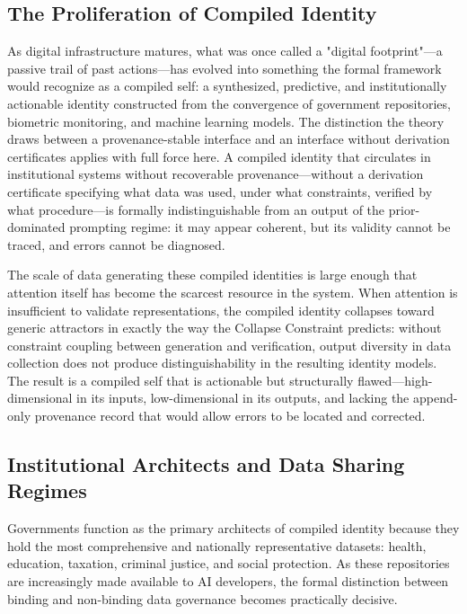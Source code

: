 \documentclass[12pt, a4paper]{article}
\theoremstyle{plain}
\theoremstyle{definition}
\theoremstyle{remark}
\begin{document}
\subsection{The Proliferation of Compiled Identity}

As digital infrastructure matures, what was once called a "digital footprint"---a passive trail of past actions---has evolved into something the formal framework would recognize as a compiled self: a synthesized, predictive, and institutionally actionable identity constructed from the convergence of government repositories, biometric monitoring, and machine learning models. The distinction the theory draws between a provenance-stable interface and an interface without derivation certificates applies with full force here. A compiled identity that circulates in institutional systems without recoverable provenance---without a derivation certificate specifying what data was used, under what constraints, verified by what procedure---is formally indistinguishable from an output of the prior-dominated prompting regime: it may appear coherent, but its validity cannot be traced, and errors cannot be diagnosed.

The scale of data generating these compiled identities is large enough that attention itself has become the scarcest resource in the system. When attention is insufficient to validate representations, the compiled identity collapses toward generic attractors in exactly the way the Collapse Constraint predicts: without constraint coupling between generation and verification, output diversity in data collection does not produce distinguishability in the resulting identity models. The result is a compiled self that is actionable but structurally flawed---high-dimensional in its inputs, low-dimensional in its outputs, and lacking the append-only provenance record that would allow errors to be located and corrected.

\subsection{Institutional Architects and Data Sharing Regimes}

Governments function as the primary architects of compiled identity because they hold the most comprehensive and nationally representative datasets: health, education, taxation, criminal justice, and social protection. As these repositories are increasingly made available to AI developers, the formal distinction between binding and non-binding data governance becomes practically decisive.
\end{document}
